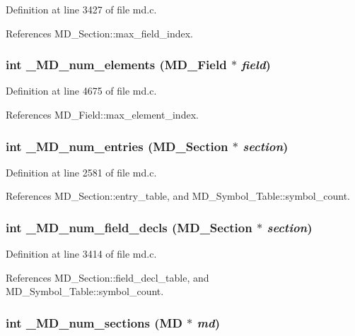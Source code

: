 Definition at line 3427 of file md.c.

References MD\_\-Section::max\_\-field\_\-index.
\subsubsection{\setlength{\rightskip}{0pt plus 5cm}int \_\-MD\_\-num\_\-elements (\bf{MD\_\-Field} $\ast$ {\em field})}\label{md_8h_7c591f0f380fc4ed36172e5c7899d831}




Definition at line 4675 of file md.c.

References MD\_\-Field::max\_\-element\_\-index.
\subsubsection{\setlength{\rightskip}{0pt plus 5cm}int \_\-MD\_\-num\_\-entries (\bf{MD\_\-Section} $\ast$ {\em section})}\label{md_8h_53bb3a6d3dc32c0b516ce53f754e9883}




Definition at line 2581 of file md.c.

References MD\_\-Section::entry\_\-table, and MD\_\-Symbol\_\-Table::symbol\_\-count.
\subsubsection{\setlength{\rightskip}{0pt plus 5cm}int \_\-MD\_\-num\_\-field\_\-decls (\bf{MD\_\-Section} $\ast$ {\em section})}\label{md_8h_d6c49bb99aa6ccf2592fd5d82ca02f73}




Definition at line 3414 of file md.c.

References MD\_\-Section::field\_\-decl\_\-table, and MD\_\-Symbol\_\-Table::symbol\_\-count.
\subsubsection{\setlength{\rightskip}{0pt plus 5cm}int \_\-MD\_\-num\_\-sections (\bf{MD} $\ast$ {\em md})}\label{md_8h_46121d9a23458a3803dc0bcb64ef2197}




